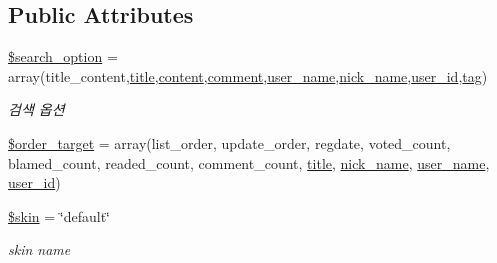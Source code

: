 \subsection*{Public Attributes}
\begin{DoxyCompactItemize}
\item 
\hyperlink{classboard_a6affe0c86966ebd06572cc4c8abde32b}{\$search\+\_\+option} = array(\textquotesingle{}title\+\_\+content\textquotesingle{},\textquotesingle{}\hyperlink{ko_8install_8php_a5b072c5fd1d2228c6ba5cee13cd142e3}{title}\textquotesingle{},\textquotesingle{}\hyperlink{classcontent}{content}\textquotesingle{},\textquotesingle{}\hyperlink{classcomment}{comment}\textquotesingle{},\textquotesingle{}\hyperlink{ko_8install_8php_a115401aff7da80e73c66e9f76505426b}{user\+\_\+name}\textquotesingle{},\textquotesingle{}\hyperlink{ko_8install_8php_a151ecae87a1f3d7e257aa089803086bd}{nick\+\_\+name}\textquotesingle{},\textquotesingle{}\hyperlink{ko_8install_8php_a74f1a394389d774e5b4cd5d1d15413f7}{user\+\_\+id}\textquotesingle{},\textquotesingle{}\hyperlink{classtag}{tag}\textquotesingle{})
\begin{DoxyCompactList}\small\item\em 검색 옵션 \end{DoxyCompactList}\item 
\hyperlink{classboard_a66d1965fe6a51e8143499adeaf3998cc}{\$order\+\_\+target} = array(\textquotesingle{}list\+\_\+order\textquotesingle{}, \textquotesingle{}update\+\_\+order\textquotesingle{}, \textquotesingle{}regdate\textquotesingle{}, \textquotesingle{}voted\+\_\+count\textquotesingle{}, \textquotesingle{}blamed\+\_\+count\textquotesingle{}, \textquotesingle{}readed\+\_\+count\textquotesingle{}, \textquotesingle{}comment\+\_\+count\textquotesingle{}, \textquotesingle{}\hyperlink{ko_8install_8php_a5b072c5fd1d2228c6ba5cee13cd142e3}{title}\textquotesingle{}, \textquotesingle{}\hyperlink{ko_8install_8php_a151ecae87a1f3d7e257aa089803086bd}{nick\+\_\+name}\textquotesingle{}, \textquotesingle{}\hyperlink{ko_8install_8php_a115401aff7da80e73c66e9f76505426b}{user\+\_\+name}\textquotesingle{}, \textquotesingle{}\hyperlink{ko_8install_8php_a74f1a394389d774e5b4cd5d1d15413f7}{user\+\_\+id}\textquotesingle{})
\item 
\hyperlink{classboard_ac7e864ad1db563c4d3f97291dd90291f}{\$skin} = \char`\"{}default\char`\"{}
\begin{DoxyCompactList}\small\item\em skin name \end{DoxyCompactList}\item 

\end{DoxyCompactItemize}
